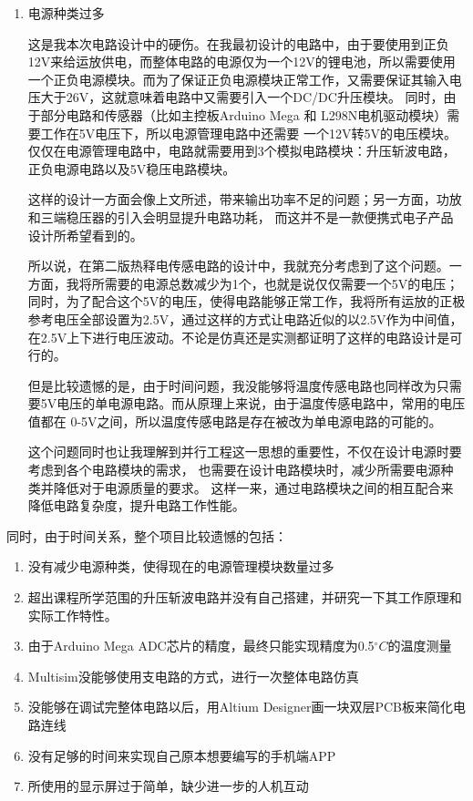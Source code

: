 \documentclass{article}
\begin{document}
\begin{spacing}{1.5}
\begin{enumerate}
    \item 电源种类过多
    
    这是我本次电路设计中的硬伤。在我最初设计的电路中，由于要使用到正负12V来给运放供电，而整体电路的电源仅为一个12V的锂电池，所以需要使用
    一个正负电源模块。而为了保证正负电源模块正常工作，又需要保证其输入电压大于26V，这就意味着电路中又需要引入一个DC/DC升压模块。
    同时，由于部分电路和传感器（比如主控板Arduino Mega 和 L298N电机驱动模块）需要工作在5V电压下，所以电源管理电路中还需要
    一个12V转5V的电压模块。
    仅仅在电源管理电路中，电路就需要用到3个模拟电路模块：升压斩波电路，正负电源电路以及5V稳压电路模块。

    这样的设计一方面会像上文所述，带来输出功率不足的问题；另一方面，功放和三端稳压器的引入会明显提升电路功耗，
    而这并不是一款便携式电子产品设计所希望看到的。

    所以说，在第二版热释电传感电路的设计中，我就充分考虑到了这个问题。一方面，我将所需要的电源总数减少为1个，也就是说仅仅需要一个5V的电压；
    同时，为了配合这个5V的电压，使得电路能够正常工作，我将所有运放的正极参考电压全部设置为2.5V，通过这样的方式让电路近似的以2.5V作为中间值，
    在2.5V上下进行电压波动。不论是仿真还是实测都证明了这样的电路设计是可行的。

    但是比较遗憾的是，由于时间问题，我没能够将温度传感电路也同样改为只需要5V电压的单电源电路。而从原理上来说，由于温度传感电路中，常用的电压值都在
    0-5V之间，所以温度传感电路是存在被改为单电源电路的可能的。

    这个问题同时也让我理解到并行工程这一思想的重要性，不仅在设计电源时要考虑到各个电路模块的需求，
    也需要在设计电路模块时，减少所需要电源种类并降低对于电源质量的要求。
    这样一来，通过电路模块之间的相互配合来降低电路复杂度，提升电路工作性能。

\end{enumerate}

同时，由于时间关系，整个项目比较遗憾的包括：

\begin{enumerate}
    \item 没有减少电源种类，使得现在的电源管理模块数量过多
    \item 超出课程所学范围的升压斩波电路并没有自己搭建，并研究一下其工作原理和实际工作特性。
    \item 由于Arduino Mega ADC芯片的精度，最终只能实现精度为0.5$^{\circ} C$的温度测量
    \item Multisim没能够使用支电路的方式，进行一次整体电路仿真
    \item 没能够在调试完整体电路以后，用Altium Designer画一块双层PCB板来简化电路连线
    \item 没有足够的时间来实现自己原本想要编写的手机端APP
    \item 所使用的显示屏过于简单，缺少进一步的人机互动
\end{enumerate}


\end{spacing}
\end{document}
